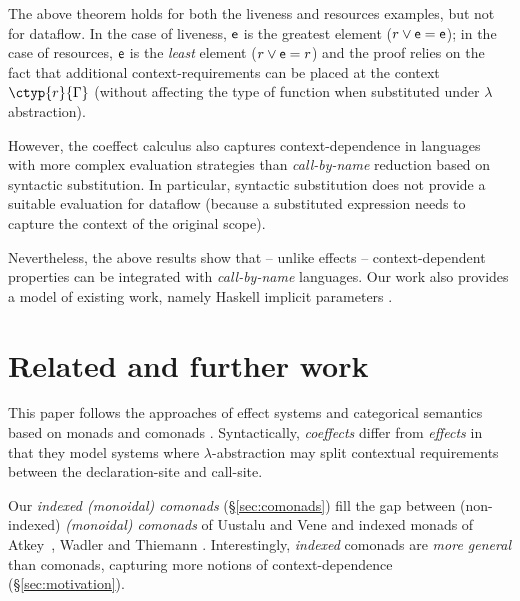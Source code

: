 The above theorem holds for both the liveness and resources examples,
but not for dataflow.  In the case of liveness, $\mathsf{e}$ is the
greatest element ($r \vee \mathsf{e} = \mathsf{e}$); in the case of
resources, $\mathsf{e}$ is the \emph{least} element ($r \vee \mathsf{e} =
r$) and the proof relies on the fact that additional
context-requirements can be placed at the context $\ctyp{r}{\Gamma}$
(without affecting the type of function when substituted under
$\lambda$ abstraction).

However, the coeffect calculus also captures context-dependence in
languages with more complex evaluation strategies than
\emph{call-by-name} reduction based on syntactic substitution.  In
particular, syntactic substitution does not provide a suitable evaluation
for dataflow (because a substituted expression needs to capture the
context of the original scope).

Nevertheless, the above results show that -- unlike effects --
context-dependent properties can be integrated with
\emph{call-by-name} languages. Our work also provides a model of
existing work, namely Haskell implicit parameters
\cite{app-implicit-parameters}.


\section{Related and further work}
\label{sec:related}

This paper follows the approaches of effect systems \cite{effects-gifford,effects-talpin-et-al,monads-effects-marriage}
and categorical semantics based on monads and comonads \cite{monad-notions,comonads-notions}. Syntactically,
\emph{coeffects} differ from \emph{effects} in that they model systems where $\lambda$-abstraction 
may split contextual requirements between the declaration-site and call-site.

Our \emph{indexed (monoidal) comonads} (\S\ref{sec:comonads}) fill the gap between (non-indexed)
\emph{(monoidal) comonads} of Uustalu and Vene \cite{comonads-notions}
and indexed monads of Atkey~\cite{monads-parameterised-notions}, Wadler and Thiemann
\cite{monads-effects-marriage}. Interestingly, \emph{indexed} comonads are \emph{more
general} than comonads, capturing more notions of context-dependence (\S\ref{sec:motivation}).


